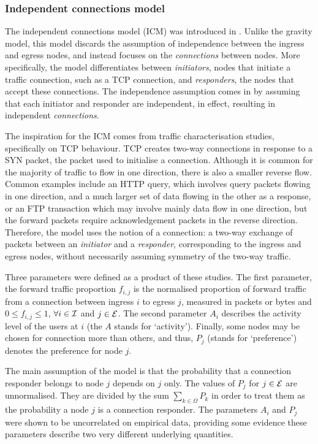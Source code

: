 \subsubsection{Independent connections model}

The independent connections model (ICM) was introduced in
\cite{Erramilli06IndepConn,Erramilli06IndepConnTech}. Unlike the
gravity model, this model discards the assumption of independence
between the ingress and egress nodes, and instead focuses on the
\textit{connections} between nodes. More specifically, the model
differentiates between \textit{initiators}, nodes that initiate a
traffic connection, such as a TCP connection, and \textit{responders},
the nodes that accept these connections. The independence assumption
comes in by assuming that each initiator and responder are
independent, in effect, resulting in independent {\em connections}.

The inspiration for the ICM comes from
traffic characterisation studies, specifically on TCP behaviour. TCP
creates two-way connections in response to a SYN packet, the packet used
to initialise a connection. Although it is
common for the majority of traffic to flow in one direction, 
there is also a smaller reverse flow. Common examples include an HTTP
query, which involves query packets flowing in one direction, and a
much larger set of data flowing in the other as a response, or an FTP transaction
which may involve mainly data flow in one direction, but the forward
packets require acknowledgement packets in the reverse direction.  Therefore, 
the model uses the notion of a connection: a two-way exchange of
packets between an \emph{initiator} and a \emph{responder}, corresponding to
the ingress and egress nodes, without necessarily assuming symmetry of the
two-way traffic. 

Three parameters were defined as a product of these studies.
The first parameter, the forward traffic proportion $f_{i,j}$ is the
normalised proportion of forward traffic from a connection between
ingress $i$ to egress $j$, measured in packets or bytes and $0 \le
f_{i,j} \le 1$, $\forall i \in \mathcal{I}$ and $j \in \mathcal{E}$. The second
parameter $A_i$ describes the activity level of the users at $i$ (the
$A$ stands for `activity').  Finally, some nodes may be chosen for
connection more than others, and thus, $P_j$ (stands for `preference')
denotes the preference for node $j$. 

The main assumption of the model
is that the probability that a connection responder belongs to node
$j$ depends on $j$ only. The values of $P_j$ for $j \in \mathcal{E}$ are
unnormalised. They are divided by the sum $\sum_{k \in \Omega} P_k$ in
order to treat them as the probability a node $j$ is a connection
responder. The parameters $A_i$ and $P_j$ were shown to be
uncorrelated on empirical data, providing some evidence these
parameters describe two very different underlying quantities.
 
